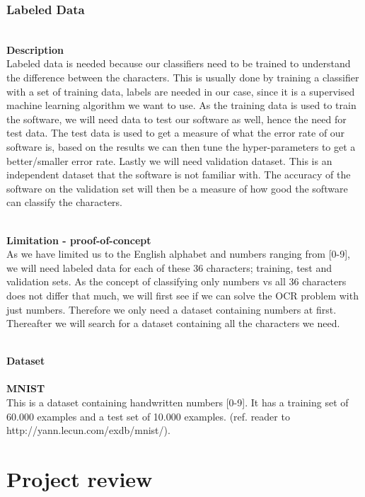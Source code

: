 \documentclass[11pt,a4paper,UKenglish]{article}
\begin{document}
\subsubsection{Labeled Data}
\noindent \\ \textbf{Description}
\noindent \\
Labeled data is needed because our classifiers need to be trained to understand
the difference between the characters. This is usually done by training a
classifier with a set of training data, labels are needed in our case,
since it is a supervised machine learning algorithm we want to use. As the
training data is used to train the software, we will need data to test our
software as well, hence the need for test data. The test data is used to get a
measure of what the error rate of our software is, based on the results we
can then tune the hyper-parameters to get a better/smaller error rate. Lastly
we will need validation dataset. This is an independent dataset that the software
is not familiar with. The accuracy of the software on the validation set will
then be a measure of how good the software can classify the characters.

\noindent \\ \textbf{Limitation - proof-of-concept}
\noindent \\
As we have limited us to the English alphabet and numbers ranging from [0-9],
we will need labeled data for each of these 36 characters; training, test and
validation sets. As the concept of classifying only numbers vs all 36
characters does not differ that much, we will first see if we can solve the OCR
problem with just numbers. Therefore we only need a dataset containing numbers
at first. Thereafter we will search for a dataset containing all the characters
we need.

\noindent \\ \textbf{Dataset}
\noindent \\
\noindent \\ \textbf{MNIST}
\noindent \\ This is a dataset containing handwritten numbers [0-9].
It has a training set of 60.000 examples and a test set of 10.000 examples.
(ref. reader to http://yann.lecun.com/exdb/mnist/).


\newpage
\section{Project review}
\label{sec:Project_review}
\end{document}
